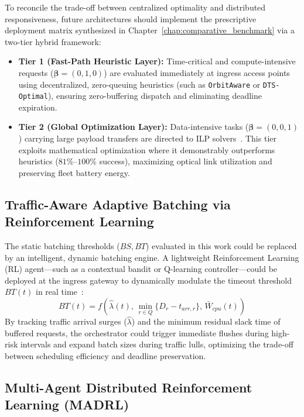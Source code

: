 To reconcile the trade-off between centralized optimality and distributed responsiveness, future architectures should implement the prescriptive deployment matrix synthesized in Chapter~\ref{chap:comparative_benchmark} via a two-tier hybrid framework:
\begin{itemize}
    \item \textbf{Tier 1 (Fast-Path Heuristic Layer):} Time-critical and compute-intensive requests ($\boldsymbol{\beta} = (0, 1, 0)$) are evaluated immediately at ingress access points using decentralized, zero-queuing heuristics (such as \texttt{OrbitAware} or \texttt{DTS-Optimal}), ensuring zero-buffering dispatch and eliminating deadline expiration.
    \item \textbf{Tier 2 (Global Optimization Layer):} Data-intensive tasks ($\boldsymbol{\beta} = (0, 0, 1)$) carrying large payload transfers are directed to ILP solvers~\cite{zhong2025leo, jiang2025remote}. This tier exploits mathematical optimization where it demonstrably outperforms heuristics ($81\%\text{--}100\%$ success), maximizing optical link utilization and preserving fleet battery energy.
\end{itemize}

\subsection{Traffic-Aware Adaptive Batching via Reinforcement Learning}
\label{subsec:future_adaptive_batching}

The static batching thresholds ($BS, BT$) evaluated in this work could be replaced by an intelligent, dynamic batching engine. A lightweight Reinforcement Learning (RL) agent—such as a contextual bandit or Q-learning controller—could be deployed at the ingress gateway to dynamically modulate the timeout threshold $BT(t)$ in real time~\cite{fan2025satellite}:
\begin{equation}
    BT(t) = f\left( \hat{\lambda}(t), \, \min_{r \in Q} \{D_r - t_{arr,r}\}, \, \bar{W}_{cpu}(t) \right)
    \label{eq:adaptive_bt}
\end{equation}
By tracking traffic arrival surges ($\hat{\lambda}$) and the minimum residual slack time of buffered requests, the orchestrator could trigger immediate flushes during high-risk intervals and expand batch sizes during traffic lulls, optimizing the trade-off between scheduling efficiency and deadline preservation.

\subsection{Multi-Agent Distributed Reinforcement Learning (MADRL)}
\label{subsec:future_madrl}

